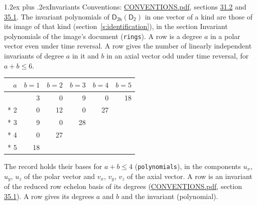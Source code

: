 \documentclass[10pt,a4paper]{article}
\makeatletter
\renewcommand\section{\@startsection{section}{1}{\z@}{-3ex plus -1ex minus -.2ex}%
  {1.2ex plus .2ex}{\normalfont\large\sffamily\bfseries\color{parttitle}}}
\numberwithin{equation}{section}
\newcommand{\grp}[1]{\mathsf{#1}}
\makeatother
\begin{document}
\section{Invariants}\label{s:invariants}
Conventions: \href{../../CONVENTIONS.pdf}{CONVENTIONS.pdf}, sections \href{../../CONVENTIONS.pdf\#conv.31.2}{31.2} and \href{../../CONVENTIONS.pdf\#conv.35.1}{35.1}.
The invariant polynomials of $\grp{D_{2h}}(\grp{D_{2}})$ in one vector of a kind are those of its image of that kind (section~\ref{s:identification}), in the section Invariant polynomials of the image's document (\texttt{rings}).
\leavevmode\label{n:index.degree.polar}\label{n:index.degree.axial}A row is a degree $a$ in a polar vector even under time reversal. A row gives the number of linearly independent invariants of degree $a$ in it and $b$ in an axial vector odd under time reversal, for $a + b \le 6$.
{\small\begin{longtable}{@{}rrrrrr@{}}\toprule
$a$ & $b = 1$ & $b = 2$ & $b = 3$ & $b = 4$ & $b = 5$\\\midrule\endhead
\bottomrule\endfoot\endlastfoot
1 & 3 & 0 & 9 & 0 & 18\\*
2 & 0 & 12 & 0 & 27 & \\*
3 & 9 & 0 & 28 &  & \\*
4 & 0 & 27 &  &  & \\*
5 & 18 &  &  &  & \\
\bottomrule\end{longtable}}
\leavevmode\label{n:local.component.polar}\label{n:local.component.axial}The record holds their bases for $a + b \le 4$ (\texttt{polynomials}), in the components $u_{x}$, $u_{y}$, $u_{z}$ of the polar vector and $v_{x}$, $v_{y}$, $v_{z}$ of the axial vector. \label{n:head.polynomial}A row is an invariant of the reduced row echelon basis of its degrees (\href{../../CONVENTIONS.pdf}{CONVENTIONS.pdf}, section \href{../../CONVENTIONS.pdf\#conv.35.1}{35.1}). A row gives its degrees $a$ and $b$ and the invariant (polynomial).
\end{document}

